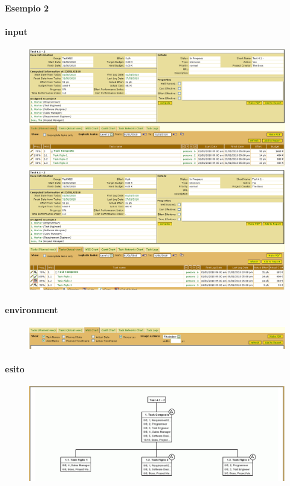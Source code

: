 \paragraph{Esempio 2}
\paragraph{input}
\begin{figure}
\centering
\includegraphics[width=\textwidth]{tests/TEST_WBS/4.1/4.1_2/Esempio_2/input.png}
\includegraphics[width=\textwidth]{tests/TEST_WBS/4.1/4.1_2/Esempio_2/input_actual.png}
\end{figure}
\paragraph{environment}
\begin{figure}
\centering
\includegraphics[width=\textwidth]{tests/TEST_WBS/4.1/4.1_2/Esempio_2/environment.png}
\end{figure}
\paragraph{esito}
\begin{figure}
\centering
\includegraphics[width=\textwidth]{tests/TEST_WBS/4.1/4.1_2/Esempio_2/output.png}
\end{figure}

